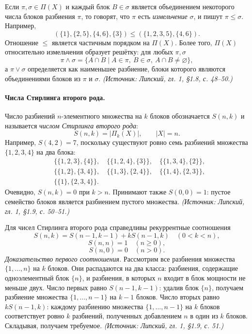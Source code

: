 \documentclass[a4paper,12pt]{article}
\begin{document}
Если \(\pi,\sigma\in\Pi(X)\) и каждый блок \(B\in\sigma\) является объединением некоторого числа блоков разбиения \(\pi\), то говорят, что \(\pi\) есть \emph{измельчение} \(\sigma\), и пишут \(\pi\le\sigma\). Например,
\[
(\{1\},\{2,5\},\{4,6\},\{3\})\le(\{1,2,3,5\},\{4,6\}).
\]
Отношение \(\le\) является частичным порядком на \(\Pi(X)\). Более того, \(\Pi(X)\) относительно измельчения образует решётку: для любых \(\pi,\sigma\)
\[
\pi\wedge\sigma=
\{A\cap B\mid A\in\pi,\ B\in\sigma,\ A\cap B\ne\varnothing\},
\]
а \(\pi\vee\sigma\) определяется как наименьшее разбиение, блоки которого являются объединениями блоков из \(\pi\) и \(\sigma\).
\textit{(Источник: Липский, гл. 1, §1.8, с. 48--50.)}

\paragraph{Числа Стирлинга второго рода.}
Число разбиений \(n\)-элементного множества на \(k\) блоков обозначается \(S(n,k)\) и называется \emph{числом Стирлинга второго рода}:
\[
S(n,k)=|\Pi_k(X)|,\qquad |X|=n.
\]
Например, \(S(4,2)=7\), поскольку существуют ровно семь разбиений множества \(\{1,2,3,4\}\) на два блока:
\[
\begin{aligned}
&\{\{1,2,3\},\{4\}\},\quad
\{\{1,2,4\},\{3\}\},\quad
\{\{1,3,4\},\{2\}\},\\
&\{\{1,2\},\{3,4\}\},\quad
\{\{1,3\},\{2,4\}\},\quad
\{\{1,4\},\{2,3\}\},\\
&\{\{1\},\{2,3,4\}\}.
\end{aligned}
\]
Очевидно, \(S(n,k)=0\) при \(k>n\). Принимают также \(S(0,0)=1\): пустое семейство блоков является разбиением пустого множества.
\textit{(Источник: Липский, гл. 1, §1.9, с. 50--51.)}

Для чисел Стирлинга второго рода справедливы рекуррентные соотношения
\[
S(n,k)=S(n-1,k-1)+kS(n-1,k)\quad(0<k<n),
\]
\[
S(n,n)=1\quad(n\ge0),
\]
\[
S(n,0)=0\quad(n>0).
\]
\emph{Доказательство первого соотношения.} Рассмотрим все разбиения множества \(\{1,\dots,n\}\) на \(k\) блоков. Они распадаются на два класса: разбиения, содержащие одноэлементный блок \(\{n\}\), и разбиения, в которых \(n\) входит в блок мощности не меньше двух. Число первых равно \(S(n-1,k-1)\): удалив блок \(\{n\}\), получаем разбиение множества \(\{1,\dots,n-1\}\) на \(k-1\) блоков. Число вторых равно \(kS(n-1,k)\): каждому разбиению множества \(\{1,\dots,n-1\}\) на \(k\) блоков соответствует ровно \(k\) разбиений, полученных добавлением \(n\) в один из \(k\) блоков. Складывая, получаем требуемое.
\textit{(Источник: Липский, гл. 1, §1.9, с. 51.)}
\end{document}
